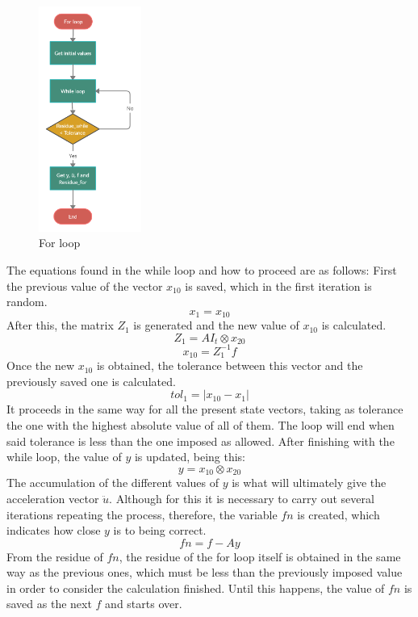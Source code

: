 \documentclass[a4paper, 10pt]{article}
\begin{document}
\begin{figure}
\centering
\includegraphics[width=0.30\textwidth]{For loop (1).png}
\caption{For loop} 
\label{For loop}
\end{figure}

The equations found in the while loop and how to proceed are as follows: First the previous value of the vector $x_10$ is saved, which in the first iteration is random.
\begin{equation}
    x_{1} = x_{10}
\end{equation}
After this, the matrix $Z_1$ is generated and the new value of $x_{10}$ is calculated.
\begin{equation}
    Z_1 = A I_t \otimes  x_{20}
\end{equation}
\begin{equation}
    x_{10} = Z_1^{-1} f
\end{equation}
Once the new $x_{10}$ is obtained, the tolerance between this vector and the previously saved one is calculated.
\begin{equation}
    tol_1 = |x_{10}-x_1|
\end{equation}
It proceeds in the same way for all the present state vectors, taking as tolerance the one with the highest absolute value of all of them. The loop will end when said tolerance is less than the one imposed as allowed. After finishing with the while loop, the value of $y$ is updated, being this:
\begin{equation}
    y = x_{10} \otimes  x_{20}
\end{equation}
The accumulation of the different values of $y$ is what will ultimately give the acceleration vector $\ddot{u}$. Although for this it is necessary to carry out several iterations repeating the process, therefore, the variable $fn$ is created, which indicates how close $y$ is to being correct.
\begin{equation}
    fn = f - A y
\end{equation}
From the residue of $fn$, the residue of the for loop itself is obtained in the same way as the previous ones, which must be less than the previously imposed value in order to consider the calculation finished. Until this happens, the value of $fn$ is saved as the next $f$ and starts over.
\end{document}

